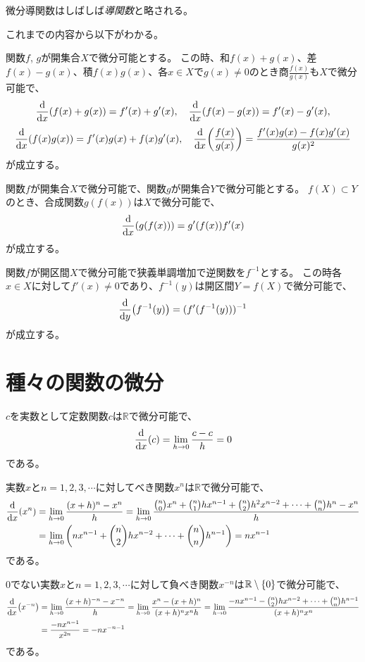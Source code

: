 微分導関数はしばしば\emph{導関数}と略される。

これまでの内容から以下がわかる。

\begin{proposition}[四則演算の導関数]
関数$f$, $g$が開集合$X$で微分可能とする。
この時、和$f(x)+g(x)$、差$f(x)-g(x)$、積$f(x)g(x)$、各$x \in X$で$g(x) \ne 0$のとき商$\frac{f(x)}{g(x)}$も$X$で微分可能で、
$$
\dv{x}(f(x)+g(x)) = f'(x)+g'(x),
\quad \dv{x}(f(x)-g(x)) = f'(x)-g'(x),
$$
$$
\dv{x}(f(x)g(x)) = f'(x)g(x)+f(x)g'(x),
\quad \dv{x}\qty(\frac{f(x)}{g(x)}) = \frac{f'(x)g(x)-f(x)g'(x)}{g(x)^2}
$$
が成立する。
\end{proposition}

\begin{proposition}[合成関数の導関数]
関数$f$が開集合$X$で微分可能で、関数$g$が開集合$Y$で微分可能とする。
$f(X) \subset Y$のとき、合成関数$g(f(x))$は$X$で微分可能で、
$$
\dv{x}(g(f(x))) = g'(f(x))f'(x)
$$
が成立する。
\end{proposition}

\begin{proposition}[逆関数の導関数]
関数$f$が開区間$X$で微分可能で狭義単調増加で逆関数を$f^{-1}$とする。
この時各$x \in X$に対して$f'(x) \ne 0$であり、$f^{-1}(y)$は開区間$Y = f(X)$で微分可能で、
$$
\dv{y}(f^{-1}(y)) = (f'(f^{-1}(y)))^{-1}
$$
が成立する。
\end{proposition}

\section{種々の関数の微分}

$c$を実数として定数関数$c$は$\mathbb{R}$で微分可能で、
$$
\dv{x}(c)
= \lim_{h \to 0}\frac{c-c}{h}
= 0
$$
である。

実数$x$と$n = 1, 2, 3, \cdots$に対してべき関数$x^n$は$\mathbb{R}$で微分可能で、
$$
\begin{aligned}
\dv{x}(x^n)
&= \lim_{h \to 0}\frac{(x+h)^n-x^n}{h}
= \lim_{h \to 0}\frac{\binom{n}{0}x^n+\binom{n}{1}h x^{n-1}+\binom{n}{2}h^2 x^{n-2}+\cdots+\binom{n}{n}h^n-x^n}{h} \\
&= \lim_{h \to 0}\qty(n x^{n-1}+\binom{n}{2}h x^{n-2}+\cdots+\binom{n}{n}h^{n-1})
= n x^{n-1}
\end{aligned}
$$
である。

$0$でない実数$x$と$n = 1, 2, 3, \cdots$に対して負べき関数$x^{-n}$は$\mathbb{R}\setminus\{0\}$で微分可能で、
$$
\begin{aligned}
\dv{x}(x^{-n})
&= \lim_{h \to 0}\frac{(x+h)^{-n}-x^{-n}}{h}
= \lim_{h \to 0}\frac{x^n-(x+h)^n}{(x+h)^n x^n h}
= \lim_{h \to 0}\frac{-n x^{n-1}-\binom{n}{2}h x^{n-2}+\cdots+\binom{n}{n}h^{n-1}}{(x+h)^n x^n} \\
&= \frac{-n x^{n-1}}{x^{2 n}}
= -n x^{-n-1}
\end{aligned}
$$
である。

